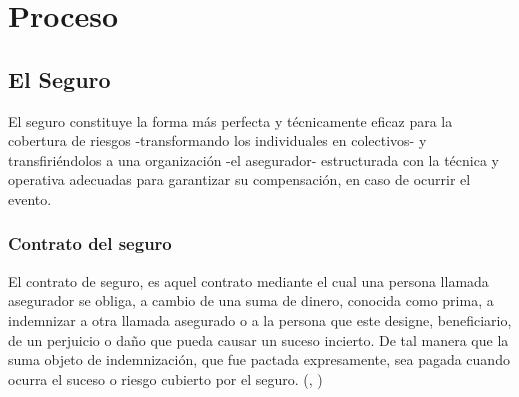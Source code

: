 \chapter{Proceso}

\section{El Seguro}	
\setlength{\parskip}{5mm}
	El seguro constituye la forma más perfecta y técnicamente eficaz para la cobertura de riesgos -transformando los individuales en colectivos- y transfiriéndolos a una organización -el asegurador- estructurada con la técnica y operativa adecuadas para garantizar su compensación, en caso de ocurrir el evento.
\setlength{\parskip}{0mm}

\subsection{Contrato del seguro}
\setlength{\parskip}{5mm}

	El contrato de seguro, es aquel contrato mediante el cual una persona llamada asegurador se obliga, a cambio de una suma de dinero, conocida como prima, a indemnizar a otra llamada asegurado o a la persona que este designe, beneficiario, de un perjuicio o daño que pueda causar un suceso incierto. De tal manera que la suma objeto de indemnización, que fue pactada expresamente, sea pagada cuando ocurra el suceso o riesgo cubierto por el seguro. (\citeauthor{contratobib}, \citeyear{contratobib})

\setlength{\parskip}{0mm}





